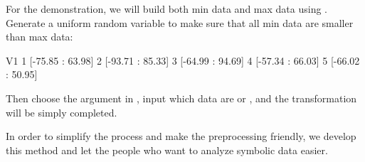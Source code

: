 \documentclass[article]{jss}
\begin{document}
For the demonstration, we will build both min data and max data using . Generate a uniform random variable to make sure that all min data are smaller than max data:

\begin{Schunk}
\begin{Soutput}
                V1
1 [-75.85 : 63.98]
2 [-93.71 : 85.33]
3 [-64.99 : 94.69]
4 [-57.34 : 66.03]
5 [-66.02 : 50.95]
\end{Soutput}
\end{Schunk}

Then choose the  argument in , input which data are  or , and the transformation will be simply completed.

In order to simplify the process and make the preprocessing friendly, we develop this method and let the people who want to analyze symbolic data easier.


\end{document}
